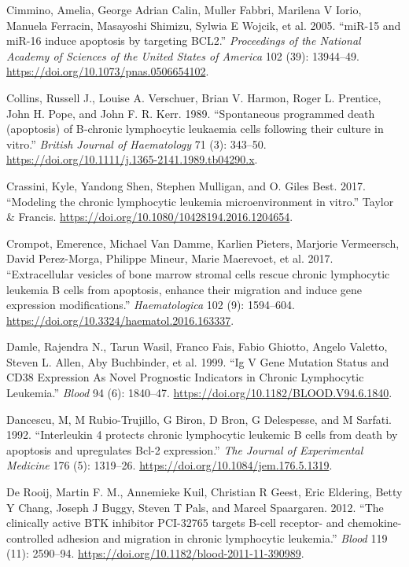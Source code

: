 \documentclass[11pt, a4paper, twosided]{book}
\newenvironment{CSLReferences}%
  {}%
  {\par}
\begin{document}
\begin{CSLReferences}{1}{0}
\leavevmode{}%
Cimmino, Amelia, George Adrian Calin, Muller Fabbri, Marilena V Iorio, Manuela Ferracin, Masayoshi Shimizu, Sylwia E Wojcik, et al. 2005. {``{miR-15 and miR-16 induce apoptosis by targeting BCL2}.''} \emph{Proceedings of the National Academy of Sciences of the United States of America} 102 (39): 13944--49. \url{https://doi.org/10.1073/pnas.0506654102}.

\leavevmode{}%
Collins, Russell J., Louise A. Verschuer, Brian V. Harmon, Roger L. Prentice, John H. Pope, and John F. R. Kerr. 1989. {``{Spontaneous programmed death (apoptosis) of B‐chronic lymphocytic leukaemia cells following their culture in vitro}.''} \emph{British Journal of Haematology} 71 (3): 343--50. \url{https://doi.org/10.1111/j.1365-2141.1989.tb04290.x}.

\leavevmode{}%
Crassini, Kyle, Yandong Shen, Stephen Mulligan, and O. Giles Best. 2017. {``{Modeling the chronic lymphocytic leukemia microenvironment in vitro}.''} Taylor \& Francis. \url{https://doi.org/10.1080/10428194.2016.1204654}.

\leavevmode{}%
Crompot, Emerence, Michael Van Damme, Karlien Pieters, Marjorie Vermeersch, David Perez-Morga, Philippe Mineur, Marie Maerevoet, et al. 2017. {``{Extracellular vesicles of bone marrow stromal cells rescue chronic lymphocytic leukemia B cells from apoptosis, enhance their migration and induce gene expression modifications}.''} \emph{Haematologica} 102 (9): 1594--604. \url{https://doi.org/10.3324/haematol.2016.163337}.

\leavevmode{}%
Damle, Rajendra N., Tarun Wasil, Franco Fais, Fabio Ghiotto, Angelo Valetto, Steven L. Allen, Aby Buchbinder, et al. 1999. {``{Ig V Gene Mutation Status and CD38 Expression As Novel Prognostic Indicators in Chronic Lymphocytic Leukemia}.''} \emph{Blood} 94 (6): 1840--47. \url{https://doi.org/10.1182/BLOOD.V94.6.1840}.

\leavevmode{}%
Dancescu, M, M Rubio-Trujillo, G Biron, D Bron, G Delespesse, and M Sarfati. 1992. {``{Interleukin 4 protects chronic lymphocytic leukemic B cells from death by apoptosis and upregulates Bcl-2 expression.}''} \emph{The Journal of Experimental Medicine} 176 (5): 1319--26. \url{https://doi.org/10.1084/jem.176.5.1319}.

\leavevmode{}%
De Rooij, Martin F. M., Annemieke Kuil, Christian R Geest, Eric Eldering, Betty Y Chang, Joseph J Buggy, Steven T Pals, and Marcel Spaargaren. 2012. {``{The clinically active BTK inhibitor PCI-32765 targets B-cell receptor- and chemokine-controlled adhesion and migration in chronic lymphocytic leukemia}.''} \emph{Blood} 119 (11): 2590--94. \url{https://doi.org/10.1182/blood-2011-11-390989}.


\end{CSLReferences}
\end{document}
